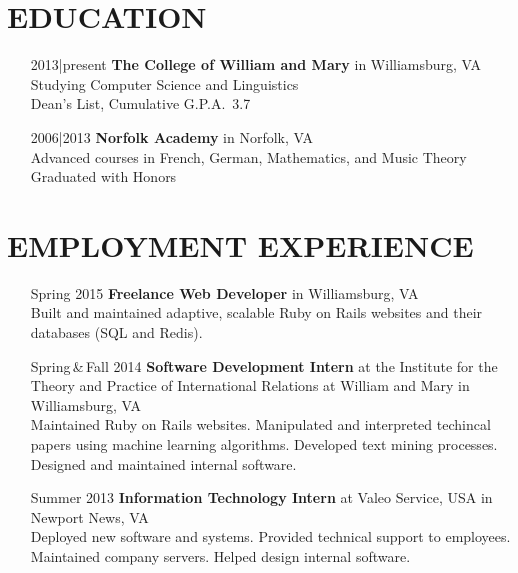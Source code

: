\documentclass{res}     %
\begin{document}
\begin{resume}

\section{EDUCATION}          
\vspace{5mm}
\begin{itemize}[font=\itshape,align=parleft,labelwidth=3cm,leftmargin=2cm]
    \item[2013|present]
        \textbf{The College of William and Mary} in Williamsburg, VA
        \\ Studying Computer Science and Linguistics
        \\ Dean's List, Cumulative G.P.A.\ 3.7
    \item[2006|2013]
        \textbf{Norfolk Academy} in Norfolk, VA
        \\ Advanced courses in French, German, Mathematics, and Music Theory
        \\ Graduated with Honors
\end{itemize}

\section{EMPLOYMENT EXPERIENCE}
\vspace{5mm}
\begin{itemize}[font=\itshape,align=parleft,labelwidth=3cm,leftmargin=2cm]
    \item[Spring 2015]
        \textbf{Freelance Web Developer}
        in Williamsburg, VA
        \vspace{1mm} \\
        Built and maintained adaptive, scalable Ruby on Rails websites and their databases (SQL and Redis).
    \item[Spring\,\&\,Fall 2014]
        \textbf{Software Development Intern}
        at the Institute for the Theory and Practice of International Relations
        at William and Mary
        in Williamsburg, VA
        \vspace{1mm} \\
        Maintained Ruby on Rails websites.
        Manipulated and interpreted techincal papers using machine learning algorithms.
        Developed text mining processes.
        Designed and maintained internal software.
    \item[Summer 2013]
        \textbf{Information Technology Intern}
        at Valeo Service, USA
        in Newport News, VA
        \vspace{1mm} \\
        Deployed new software and systems.
        Provided technical support to employees.
        Maintained company servers.
        Helped design internal software.
\end{itemize}


\end{resume}
\end{document}
